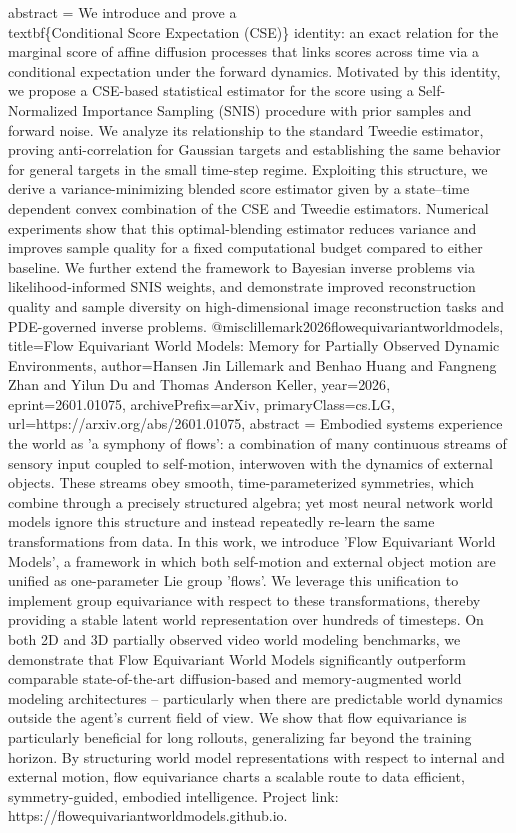 {      abstract = {We introduce and prove a \\textbf\{Conditional Score Expectation (CSE)\} identity: an exact relation for the marginal score of affine diffusion processes that links scores across time via a conditional expectation under the forward dynamics. Motivated by this identity, we propose a CSE-based statistical estimator for the score using a Self-Normalized Importance Sampling (SNIS) procedure with prior samples and forward noise. We analyze its relationship to the standard Tweedie estimator, proving anti-correlation for Gaussian targets and establishing the same behavior for general targets in the small time-step regime. Exploiting this structure, we derive a variance-minimizing blended score estimator given by a state--time dependent convex combination of the CSE and Tweedie estimators. Numerical experiments show that this optimal-blending estimator reduces variance and improves sample quality for a fixed computational budget compared to either baseline. We further extend the framework to Bayesian inverse problems via likelihood-informed SNIS weights, and demonstrate improved reconstruction quality and sample diversity on high-dimensional image reconstruction tasks and PDE-governed inverse problems.}
}@misc{lillemark2026flowequivariantworldmodels,
      title={Flow Equivariant World Models: Memory for Partially Observed Dynamic Environments}, 
      author={Hansen Jin Lillemark and Benhao Huang and Fangneng Zhan and Yilun Du and Thomas Anderson Keller},
      year={2026},
      eprint={2601.01075},
      archivePrefix={arXiv},
      primaryClass={cs.LG},
      url={https://arxiv.org/abs/2601.01075},
      abstract = {Embodied systems experience the world as 'a symphony of flows': a combination of many continuous streams of sensory input coupled to self-motion, interwoven with the dynamics of external objects. These streams obey smooth, time-parameterized symmetries, which combine through a precisely structured algebra; yet most neural network world models ignore this structure and instead repeatedly re-learn the same transformations from data. In this work, we introduce 'Flow Equivariant World Models', a framework in which both self-motion and external object motion are unified as one-parameter Lie group 'flows'. We leverage this unification to implement group equivariance with respect to these transformations, thereby providing a stable latent world representation over hundreds of timesteps. On both 2D and 3D partially observed video world modeling benchmarks, we demonstrate that Flow Equivariant World Models significantly outperform comparable state-of-the-art diffusion-based and memory-augmented world modeling architectures -- particularly when there are predictable world dynamics outside the agent's current field of view. We show that flow equivariance is particularly beneficial for long rollouts, generalizing far beyond the training horizon. By structuring world model representations with respect to internal and external motion, flow equivariance charts a scalable route to data efficient, symmetry-guided, embodied intelligence. Project link: https://flowequivariantworldmodels.github.io.}
}
